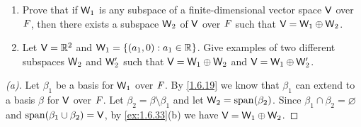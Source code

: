 \begin{ex}\label{ex:1.6.34}
  \quad
  \begin{enumerate}
    \item Prove that if \(\mathsf{W}_1\) is any subspace of a finite-dimensional vector space \(\mathsf{V}\) over \(\mathit{F}\), then there exists a subspace \(\mathsf{W}_2\) of \(\mathsf{V}\) over \(\mathit{F}\) such that \(\mathsf{V} = \mathsf{W}_1 \oplus \mathsf{W}_2\).
    \item Let \(\mathsf{V} = \mathbb{R}^2\) and \(\mathsf{W}_1 = \left\lbrace(a_1, 0) : a_1 \in \mathbb{R}\right\rbrace\).
          Give examples of two different subspaces \(\mathsf{W}_2\) and \(\mathsf{W}_2'\) such that \(\mathsf{V} = \mathsf{W}_1 \oplus \mathsf{W}_2\) and \(\mathsf{V} = \mathsf{W}_1 \oplus \mathsf{W}_2'\).
  \end{enumerate}
\end{ex}

\begin{proof}[(a)]
  Let \(\beta_1\) be a basis for \(\mathsf{W}_1\) over \(\mathit{F}\).
  By \cref{1.6.19} we know that \(\beta_1\) can extend to a basis \(\beta\) for \(\mathsf{V}\) over \(\mathit{F}\).
  Let \(\beta_2 = \beta \setminus \beta_1\) and let \(\W_2 = \spn{\beta_2}\).
  Since \(\beta_1 \cap \beta_2 = \varnothing\) and \(\spn{\beta_1 \cup \beta_2} = \V\), by \cref{ex:1.6.33}(b) we have \(\mathsf{V} = \mathsf{W}_1 \oplus \mathsf{W}_2\).
\end{proof}

